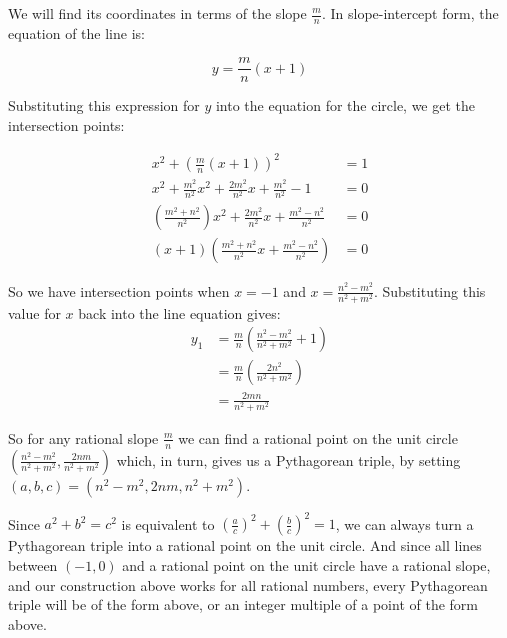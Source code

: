 \documentclass{article}
\begin{document}
We will find its coordinates in terms of the slope $\frac{m}{n}$. In
slope-intercept form, the equation of the line is:

\[ y = \frac{m}{n}(x+1) \]

Substituting this expression for $y$ into the equation for the circle, we
get the intersection points:

\begin{align*}
x^2 + \left(\frac{m}{n}(x+1)\right)^2 &= 1 \\
x^2 + \frac{m^2}{n^2} x^2 + \frac{2m^2}{n^2} x + \frac{m^2}{n^2} - 1 &= 0 \\
\left(\frac{m^2+n^2}{n^2}\right) x^2 + \frac{2m^2}{n^2} x + \frac{m^2-n^2}{n^2} &= 0 \\
\left(x+1\right)\left(\frac{m^2+n^2}{n^2} x + \frac{m^2-n^2}{n^2}\right) &= 0
\end{align*}

So we have intersection points when $x = -1$ and $x = \frac{n^2-m^2}{n^2+m^2}$. 
Substituting this value for $x$ back into the line equation gives:
\begin{align*}
y_1 &= \frac{m}{n}\left(\frac{n^2-m^2}{n^2+m^2} + 1 \right) \\
 &= \frac{m}{n}\left(\frac{2n^2}{n^2+m^2}\right) \\
 &= \frac{2mn}{n^2+m^2}
\end{align*}

So for any rational slope $\frac{m}{n}$ we can find a rational point on the
unit circle $\left(\frac{n^2-m^2}{n^2+m^2}, \frac{2nm}{n^2+m^2}\right)$
which, in turn, gives us a Pythagorean triple, by setting 
$(a,b,c)=(n^2-m^2, 2nm, n^2+m^2)$.

Since $a^2 + b^2 = c^2$ is equivalent to 
$\left(\frac{a}{c}\right)^2 + \left(\frac{b}{c}\right)^2 = 1$, we can always turn a 
Pythagorean triple into a rational point on the unit circle.
And since all lines between $(-1,0)$ and a rational point on the unit circle have
a rational slope, and our construction above works for all rational numbers, every
Pythagorean triple will be of the form above, or an integer multiple of a point of
the form above.
\end{document}
